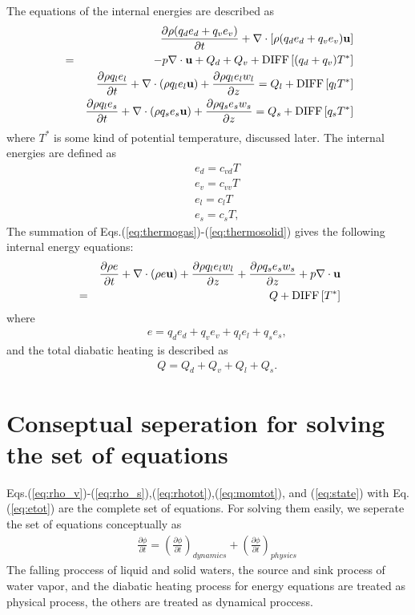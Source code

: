 The equations of the internal energies are described as
\begin{eqnarray}
&&  \frac{\partial \rho (q_d e_d + q_v e_v) }{\partial t} +
  \nabla \cdot \left[ \rho (q_d e_d + q_v e_v ){\bf u} \right] \nonumber\\
&=& - p \nabla \cdot {\bf u} + Q_{d}+ Q_{v} + {\rm DIFF}\left[(q_d+q_v)T^{*} \right]
\label{eq:thermogas}\\
&&  \frac{\partial \rho q_l e_l}{\partial t} +
  \nabla \cdot \left( \rho q_l e_l {\bf u} \right)
+ \frac{\partial \rho q_l e_l w_l}{\partial z}
= Q_l + {\rm DIFF}\left[q_l T^{*} \right]
\label{eq:thermoliquid}\\
&&  \frac{\partial \rho q_l e_s}{\partial t} +
  \nabla \cdot \left( \rho q_s e_s {\bf u} \right)
+ \frac{\partial \rho q_s e_s w_s}{\partial z}
= Q_s + {\rm DIFF}\left[q_s T^{*} \right]
\label{eq:thermosolid}
\end{eqnarray}
where $T^*$ is some kind of potential temperature, discussed later.
The internal energies are defined as
\begin{eqnarray}
&& e_d = c_{vd} T\\
&& e_v = c_{vv} T\\
&& e_l = c_{l} T\\
&& e_s = c_{s} T,
\end{eqnarray}
The summation of Eqs.(\ref{eq:thermogas})-(\ref{eq:thermosolid})
gives the following internal energy equations:
\begin{eqnarray}
&&  \frac{\partial \rho e  }{\partial t}
+  \nabla \cdot \left( \rho e {\bf u} \right)
+ \frac{\partial \rho q_l e_l w_l}{\partial z}
 + \frac{\partial \rho q_s e_s w_s}{\partial z}
 + p \nabla \cdot {\bf u}\nonumber\\
&=&  Q + {\rm DIFF}\left[T^{*} \right]
\label{eq:etot}
\end{eqnarray}
where
\begin{eqnarray}
&&  e = q_d e_d + q_v e_v + q_l e_l + q_s e_s,
\end{eqnarray}
and the total diabatic heating is described as
\begin{eqnarray}
&&  Q = Q_d + Q_v + Q_l + Q_s.
\end{eqnarray}

\section{Conseptual seperation for solving the set of equations}

Eqs.(\ref{eq:rho_v})-(\ref{eq:rho_s}),(\ref{eq:rhotot}),(\ref{eq:momtot}),
and (\ref{eq:state}) with Eq.(\ref{eq:etot}) are the complete set of equations.
For solving them easily, we seperate the set of equations conceptually as
\begin{eqnarray}
&&  \frac{\partial \phi}{\partial t} =
\left(\frac{\partial \phi}{\partial t}\right)_{dynamics}
+\left(\frac{\partial \phi}{\partial t}\right)_{physics}
\end{eqnarray}
The falling proccess of liquid and solid waters,
the source and sink process of water vapor, and
the diabatic heating process for energy equations are treated
as physical process, the others are treated as dynamical proccess.

